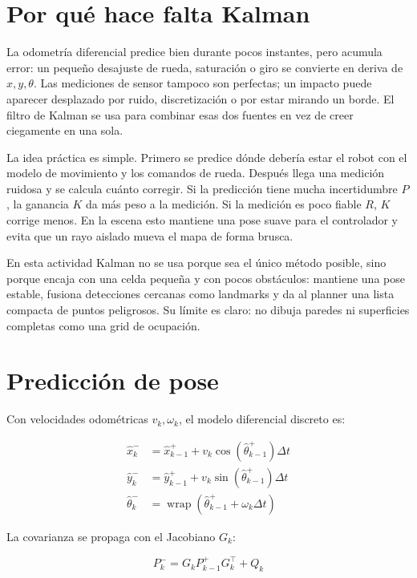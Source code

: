\section{Por qué hace falta Kalman}

La odometría diferencial predice bien durante pocos instantes, pero acumula error:
un pequeño desajuste de rueda, saturación o giro se convierte en deriva de
\(x,y,\theta\). Las mediciones de sensor tampoco son perfectas; un impacto puede
aparecer desplazado por ruido, discretización o por estar mirando un borde. El
filtro de Kalman se usa para combinar esas dos fuentes en vez de creer ciegamente
en una sola.

La idea práctica es simple. Primero se predice dónde debería estar el robot con
el modelo de movimiento y los comandos de rueda. Después llega una medición
ruidosa y se calcula cuánto corregir. Si la predicción tiene mucha incertidumbre
\(P\), la ganancia \(K\) da más peso a la medición. Si la medición es poco fiable
\(R\), \(K\) corrige menos. En la escena esto mantiene una pose suave para el
controlador y evita que un rayo aislado mueva el mapa de forma brusca.

En esta actividad Kalman no se usa porque sea el único método posible, sino
porque encaja con una celda pequeña y con pocos obstáculos: mantiene una pose
estable, fusiona detecciones cercanas como landmarks y da al planner una lista
compacta de puntos peligrosos. Su límite es claro: no dibuja paredes ni
superficies completas como una grid de ocupación.

\section{Predicción de pose}

Con velocidades odométricas \(v_k,\omega_k\), el modelo diferencial discreto es:

\[
\begin{aligned}
\hat{x}_{k}^{-} &= \hat{x}_{k-1}^{+} + v_k\cos(\hat{\theta}_{k-1}^{+})\Delta t\\
\hat{y}_{k}^{-} &= \hat{y}_{k-1}^{+} + v_k\sin(\hat{\theta}_{k-1}^{+})\Delta t\\
\hat{\theta}_{k}^{-} &= \operatorname{wrap}(\hat{\theta}_{k-1}^{+}+\omega_k\Delta t)
\end{aligned}
\]

La covarianza se propaga con el Jacobiano \(G_k\):

\[
P_k^- = G_k P_{k-1}^+ G_k^\top + Q_k
\]

